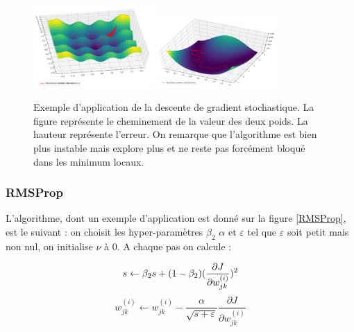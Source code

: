 \begin{figure}[!h]
\centering
\includegraphics[width=130pt]{"images/MLP/descentedegradientnewtonnienne"}
\hspace*{10mm}
\includegraphics[width=130pt]{"images/MLP/descentedegradientnewtonniennepropre"}
\caption{Exemple d'application de la descente de gradient stochastique. La figure représente le cheminement de la valeur des deux poids. La hauteur représente l'erreur. On remarque que l'algorithme est bien plus instable mais explore plus et ne reste pas forcément bloqué dans les minimum locaux.}
\label{descentedegradientnewtonnienne}
\end{figure}

\subsubsection{RMSProp}
L'algorithme, dont un exemple d'application est donné sur la figure \ref{RMSProp}, est le suivant : on choisit les hyper-paramètres $\beta_2$ $\alpha$ et $\varepsilon$ tel que $\varepsilon$ soit petit mais non nul, on initialise $\nu$ à 0.
A chaque pas on calcule :

\begin{displaymath}
s \leftarrow \beta_2 s + (1-\beta_2)  (\frac{\partial J}{\partial w_{jk}^{(i)}})^2 \\
\end{displaymath}
\begin{displaymath}
w_{jk}^{(i)} \leftarrow w_{jk}^{(i)} - \frac{\alpha}{\sqrt{s+\varepsilon}}\frac{\partial J}{\partial w_{jk}^{(i)}}
\end{displaymath}

